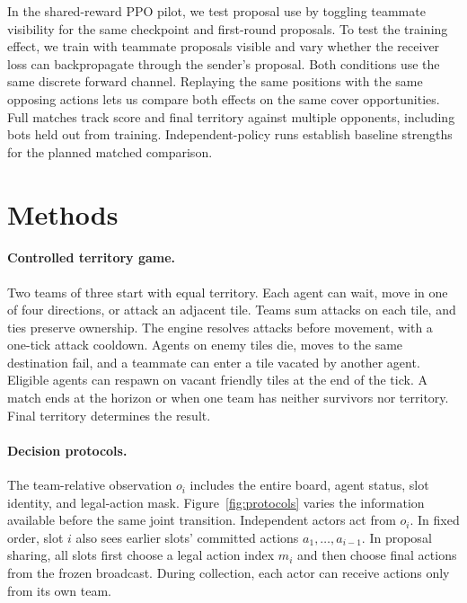 \documentclass{article}
\begin{document}
In the shared-reward PPO pilot, we test proposal use by toggling teammate visibility for the same checkpoint and first-round proposals. To test the training effect, we train with teammate proposals visible and vary whether the receiver loss can backpropagate through the sender's proposal. Both conditions use the same discrete forward channel. Replaying the same positions with the same opposing actions lets us compare both effects on the same cover opportunities. Full matches track score and final territory against multiple opponents, including bots held out from training. Independent-policy runs establish baseline strengths for the planned matched comparison.

\clearpage


\section{Methods}
\label{sec:methods}

\paragraph{Controlled territory game.}
Two teams of three start with equal territory. Each agent can wait, move in one of four directions, or attack an adjacent tile. Teams sum attacks on each tile, and ties preserve ownership. The engine resolves attacks before movement, with a one-tick attack cooldown. Agents on enemy tiles die, moves to the same destination fail, and a teammate can enter a tile vacated by another agent. Eligible agents can respawn on vacant friendly tiles at the end of the tick. A match ends at the horizon or when one team has neither survivors nor territory. Final territory determines the result.

\paragraph{Decision protocols.}
The team-relative observation \(o_i\) includes the entire board, agent status, slot identity, and legal-action mask. Figure~\ref{fig:protocols} varies the information available before the same joint transition. Independent actors act from \(o_i\). In fixed order, slot \(i\) also sees earlier slots' committed actions \(a_1,\ldots,a_{i-1}\). In proposal sharing, all slots first choose a legal action index \(m_i\) and then choose final actions from the frozen broadcast. During collection, each actor can receive actions only from its own team.
\end{document}
